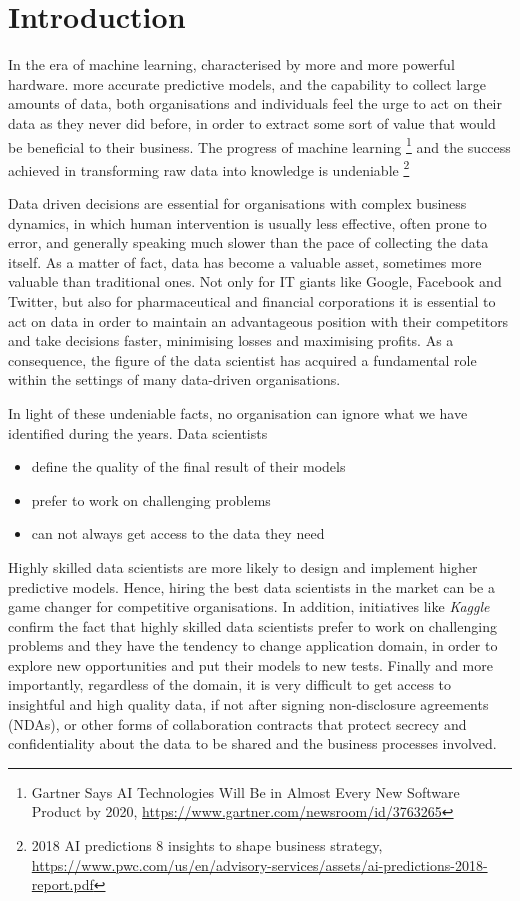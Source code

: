 \documentclass[12pt, a4paper,titlepage]{extreport}
\begin{document}
\section{Introduction}
In the era of machine learning, characterised by more and more powerful hardware. more accurate predictive models, and the capability to collect large amounts of data, both organisations and individuals feel the urge to act on their data as they never did before, in order to extract some sort of value that would be beneficial to their business. The progress of machine learning \footnote{Gartner Says AI Technologies Will Be in Almost Every New Software Product by 2020, \url{https://www.gartner.com/newsroom/id/3763265}} and the success achieved in transforming raw data into knowledge is undeniable \footnote{2018 AI predictions 8 insights to shape business strategy, \url{https://www.pwc.com/us/en/advisory-services/assets/ai-predictions-2018-report.pdf} } 

Data driven decisions are essential for organisations with complex business dynamics, in which human intervention is usually less effective, often prone to error, and generally speaking much slower than the pace of collecting the data itself. As a matter of fact, data has become a valuable asset, sometimes more valuable than traditional ones. Not only for IT giants like Google, Facebook and Twitter, but also for pharmaceutical and financial corporations it is essential to act on data in order to maintain an advantageous position with their competitors and take decisions faster, minimising losses and maximising profits. As a consequence, the figure of the data scientist has acquired a fundamental role within the settings of many data-driven organisations.

In light of these undeniable facts, no organisation can ignore what we have identified during the years. Data scientists

\begin{itemize}
\item define the quality of the final result of their models
\item prefer to work on challenging problems
\item can not always get access to the data they need
\end{itemize}

Highly skilled data scientists are more likely to design and implement higher predictive models. Hence, hiring the best data scientists in the market can be a game changer for competitive organisations. In addition, initiatives like \textit{Kaggle} \cite{kaggle} confirm the fact that highly skilled data scientists prefer to work on challenging problems and they have the tendency to change application domain, in order to explore new opportunities and put their models to new tests.
Finally and more importantly, regardless of the domain, it is very difficult to get access to insightful and high quality data, if not after signing non-disclosure agreements (NDAs), or other forms of collaboration contracts that protect secrecy and confidentiality about the data to be shared and the business processes involved.
\end{document}
